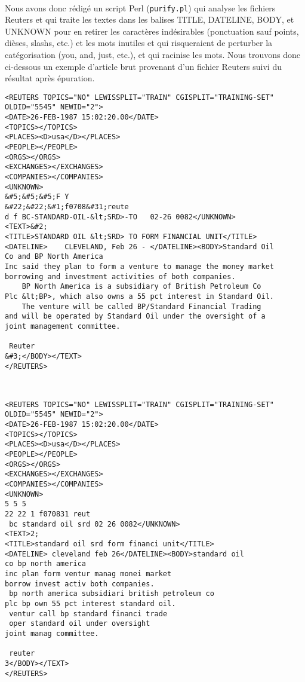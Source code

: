 \paragraph{}
Nous avons donc rédigé un script Perl (\texttt{purify.pl}) qui analyse les fichiers Reuters et qui traite les textes dans les balises TITLE, DATELINE, BODY, et UNKNOWN pour en retirer les caractères indésirables (ponctuation sauf points, dièses, slashs, etc.) et les mots inutiles et qui risqueraient de perturber la catégorisation (you, and, just, etc.), et qui racinise les mots. Nous trouvons donc ci-dessous un exemple d'article brut provenant d'un fichier Reuters suivi du résultat après épuration.
~~\\
\begin{verbatim}
<REUTERS TOPICS="NO" LEWISSPLIT="TRAIN" CGISPLIT="TRAINING-SET"
OLDID="5545" NEWID="2">
<DATE>26-FEB-1987 15:02:20.00</DATE>
<TOPICS></TOPICS>
<PLACES><D>usa</D></PLACES>
<PEOPLE></PEOPLE>
<ORGS></ORGS>
<EXCHANGES></EXCHANGES>
<COMPANIES></COMPANIES>
<UNKNOWN> 
&#5;&#5;&#5;F Y
&#22;&#22;&#1;f0708&#31;reute
d f BC-STANDARD-OIL-&lt;SRD>-TO   02-26 0082</UNKNOWN>
<TEXT>&#2;
<TITLE>STANDARD OIL &lt;SRD> TO FORM FINANCIAL UNIT</TITLE>
<DATELINE>    CLEVELAND, Feb 26 - </DATELINE><BODY>Standard Oil
Co and BP North America
Inc said they plan to form a venture to manage the money market
borrowing and investment activities of both companies.
    BP North America is a subsidiary of British Petroleum Co
Plc &lt;BP>, which also owns a 55 pct interest in Standard Oil.
    The venture will be called BP/Standard Financial Trading
and will be operated by Standard Oil under the oversight of a
joint management committee.

 Reuter
&#3;</BODY></TEXT>
</REUTERS>
\end{verbatim}
~~\\
\begin{verbatim}
<REUTERS TOPICS="NO" LEWISSPLIT="TRAIN" CGISPLIT="TRAINING-SET"
OLDID="5545" NEWID="2">
<DATE>26-FEB-1987 15:02:20.00</DATE>
<TOPICS></TOPICS>
<PLACES><D>usa</D></PLACES>
<PEOPLE></PEOPLE>
<ORGS></ORGS>
<EXCHANGES></EXCHANGES>
<COMPANIES></COMPANIES>
<UNKNOWN> 
5 5 5 
22 22 1 f070831 reut
 bc standard oil srd 02 26 0082</UNKNOWN>
<TEXT>2;
<TITLE>standard oil srd form financi unit</TITLE>
<DATELINE> cleveland feb 26</DATELINE><BODY>standard oil
co bp north america
inc plan form ventur manag monei market
borrow invest activ both companies.
 bp north america subsidiari british petroleum co
plc bp own 55 pct interest standard oil.
 ventur call bp standard financi trade
 oper standard oil under oversight 
joint manag committee.

 reuter
3</BODY></TEXT>
</REUTERS>
\end{verbatim}


